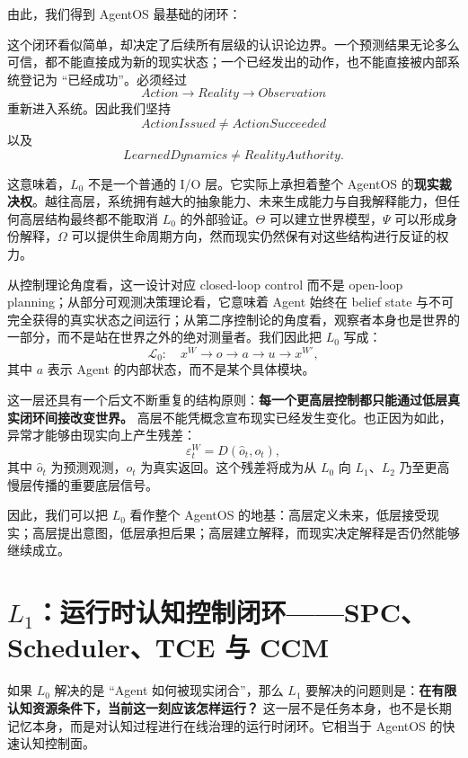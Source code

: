 由此，我们得到 AgentOS 最基础的闭环：
\begin{statementbox}
\centering
{}
\end{statementbox}

这个闭环看似简单，却决定了后续所有层级的认识论边界。一个预测结果无论多么可信，都不能直接成为新的现实状态；一个已经发出的动作，也不能直接被内部系统登记为 ``已经成功''。必须经过
\[
Action
\rightarrow
Reality
\rightarrow
Observation
\]
重新进入系统。因此我们坚持
\[
\boxed{
ActionIssued\neq ActionSucceeded
}
\]
以及
\[
\boxed{
LearnedDynamics\neq RealityAuthority.
}
\]

这意味着，$L_0$ 不是一个普通的 I/O 层。它实际上承担着整个 AgentOS 的\textbf{现实裁决权}。越往高层，系统拥有越大的抽象能力、未来生成能力与自我解释能力，但任何高层结构最终都不能取消 $L_0$ 的外部验证。$\Theta$ 可以建立世界模型，$\Psi$ 可以形成身份解释，$\Omega$ 可以提供生命周期方向，然而现实仍然保有对这些结构进行反证的权力。

从控制理论角度看，这一设计对应 closed-loop control 而不是 open-loop planning；从部分可观测决策理论看，它意味着 Agent 始终在 belief state 与不可完全获得的真实状态之间运行；从第二序控制论的角度看，观察者本身也是世界的一部分，而不是站在世界之外的绝对测量者。我们因此把 $L_0$ 写成：
\[
\mathcal{L}_0:
\quad
x^W
\rightarrow
o
\rightarrow
a
\rightarrow
u
\rightarrow
x^{W\prime},
\]
其中 $a$ 表示 Agent 的内部状态，而不是某个具体模块。

这一层还具有一个后文不断重复的结构原则：\textbf{每一个更高层控制都只能通过低层真实闭环间接改变世界。} 高层不能凭概念宣布现实已经发生变化。也正因为如此，异常才能够由现实向上产生残差：
\[
\varepsilon^{W}_t
=
D
\left(
\hat{o}_t,
o_t
\right),
\]
其中 $\hat{o}_t$ 为预测观测，$o_t$ 为真实返回。这个残差将成为从 $L_0$ 向 $L_1$、$L_2$ 乃至更高慢层传播的重要底层信号。

因此，我们可以把 $L_0$ 看作整个 AgentOS 的地基：高层定义未来，低层接受现实；高层提出意图，低层承担后果；高层建立解释，而现实决定解释是否仍然能够继续成立。

\section{$L_1$：运行时认知控制闭环——SPC、Scheduler、TCE 与 CCM}

如果 $L_0$ 解决的是 ``Agent 如何被现实闭合''，那么 $L_1$ 要解决的问题则是：\textbf{在有限认知资源条件下，当前这一刻应该怎样运行？} 这一层不是任务本身，也不是长期记忆本身，而是对认知过程进行在线治理的运行时闭环。它相当于 AgentOS 的快速认知控制面。

